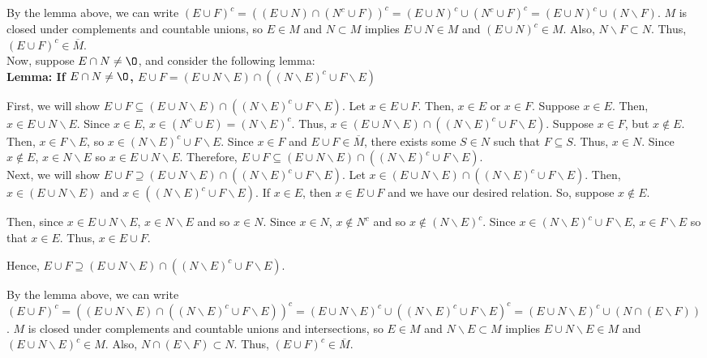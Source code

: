 \begin{enumerate}
\begin{pf}
	\noindent By the lemma above, we can write $(E \cup F)^c = ((E\cup N) \cap (N^c \cup F))^c=(E \cup N)^c \cup (N^c \cup F)^c= (E \cup N)^c \cup (N \backslash F) $. $M$ is closed under complements and countable unions, so $E \in M$ and $N \subset M$ implies $E \cup N \in M$ and $(E \cup N)^c \in M$. Also, $N \backslash F \subset N$. Thus, $(E \cup F)^c \in \overline{M}$. 
	\\
	Now, suppose $E \cap N \neq \O$, and consider the following lemma: 
\\	\noindent \textbf{Lemma: If $E \cap N \neq \O$, $E \cup F=(E\cup N\backslash E) \cap ((N \backslash E)^c \cup F \backslash E)$}
	\begin{pf}
	First, we will show $E \cup F\subseteq (E\cup N\backslash E) \cap ((N \backslash E)^c \cup F \backslash E)$. Let $x \in E \cup F$. Then, $x \in E$ or $x \in F$. Suppose $x \in E$. Then, $x \in E\cup N\backslash E$. Since $x \in E$, $x \in (N^c \cup E)=(N \backslash E)^c $. 
	Thus, $x \in (E\cup N\backslash E) \cap ((N \backslash E)^c \cup F \backslash E)$. Suppose $x \in F$, but $x \not\in E$. Then, $x \in F \backslash E$, so $x \in (N \backslash E)^c \cup F \backslash E$. Since $x \in F$ and $E \cup F \in \overline{M}$, there exists some $S \in N$ such that $F \subseteq S$. Thus, $x \in N$. Since $x \not\in E$, $x \in N\backslash E$ so $x \in E \cup N \backslash E$. Therefore, $E \cup F\subseteq (E\cup N\backslash E) \cap ((N \backslash E)^c \cup F \backslash E)$. \\
	Next, we will show $E \cup F \supseteq (E\cup N\backslash E) \cap ((N \backslash E)^c \cup F \backslash E)$. Let $x \in (E\cup N \backslash  E) \cap ((N \backslash E)^c \cup F \backslash E)$.  Then, $x \in (E\cup N\backslash E)$ and $x \in  ((N \backslash E)^c \cup F \backslash E)$. If $x \in E$, then $x \in E \cup F$ and we have our desired relation. So, suppose $x \not\in E$. 
	
	Then, since $x \in E \cup N \backslash E$, $x \in N \backslash E$ and so $x \in N$. Since $x \in N$, $x \not \in N^c$ and so $x \not \in (N\backslash E)^c$. Since $x \in (N\backslash E)^c \cup F \backslash E$,  $x \in F \backslash E$ so that $x \in E$. Thus, $x \in E \cup F$. 
	
	Hence, $E \cup F\supseteq (E\cup N\backslash E) \cap ((N \backslash E)^c \cup F \backslash E)$. 
	\end{pf}
\noindent By the lemma above, we can write $(E \cup F)^c = ((E\cup N\backslash E) \cap ((N \backslash E)^c \cup F \backslash E))^c=(E\cup N\backslash E)^c \cup ((N \backslash E)^c \cup F \backslash E)^c=  (E\cup N\backslash E)^c \cup (N \cap (E \backslash F))$. $M$ is closed under complements and countable unions and intersections, so $E \in M$ and $N\backslash E \subset M$ implies $E \cup N\backslash E \in M$ and $(E\cup N\backslash E)^c \in M$. Also, $N \cap (E \backslash F) \subset N$. Thus, $(E \cup F)^c \in \overline{M}$. 


\end{pf}
\end{enumerate}

